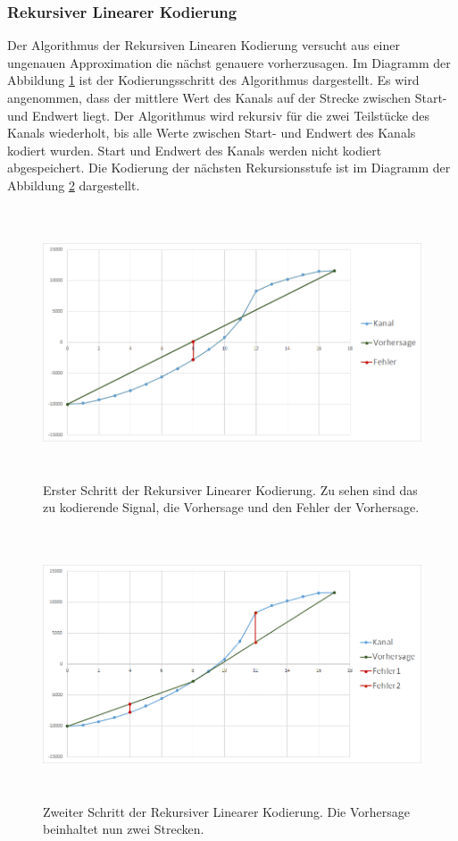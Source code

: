 \subsubsection{Rekursiver Linearer Kodierung}
Der Algorithmus der Rekursiven Linearen Kodierung versucht aus einer ungenauen Approximation die nächst genauere vorherzusagen. Im Diagramm der Abbildung \ref{konzept:loesung2:algorithm:step1} ist der Kodierungsschritt des Algorithmus dargestellt. Es wird angenommen, dass der mittlere Wert des Kanals auf der Strecke zwischen Start- und Endwert liegt. Der Algorithmus wird rekursiv für die zwei Teilstücke des Kanals wiederholt, bis alle Werte zwischen Start- und Endwert des Kanals kodiert wurden. Start und Endwert des Kanals werden nicht kodiert abgespeichert. Die Kodierung der nächsten Rekursionsstufe ist im Diagramm der Abbildung \ref{konzept:loesung2:algorithm:step2} dargestellt.
\begin{figure}[!htbp]
	\center
	\includegraphics[width=1\textwidth,height=8cm,keepaspectratio]{./pictures/konzept/solution2/algorithm_step1.png}
	\caption{Erster Schritt der Rekursiver Linearer Kodierung. Zu sehen sind das zu kodierende Signal, die Vorhersage und den Fehler der Vorhersage.}
	\label{konzept:loesung2:algorithm:step1}
\end{figure} 
\begin{figure}[!htbp]
	\center
	\includegraphics[width=1\textwidth,height=8cm,keepaspectratio]{./pictures/konzept/solution2/algorithm_step2.png}
	\caption{Zweiter Schritt der Rekursiver Linearer Kodierung. Die Vorhersage beinhaltet nun zwei Strecken.}
	\label{konzept:loesung2:algorithm:step2}
\end{figure} 

